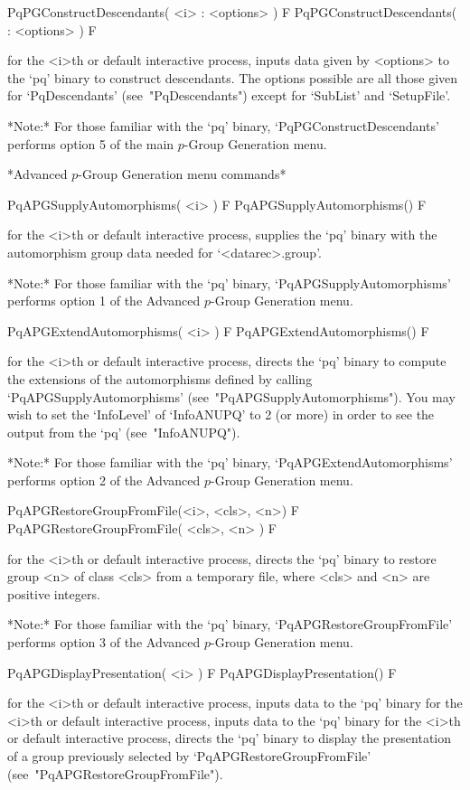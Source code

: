 \>PqPGConstructDescendants( <i> : <options> ) F
\>PqPGConstructDescendants( : <options> ) F

for the <i>th or default interactive {\ANUPQ} process, inputs data  given
by <options> to the `pq' binary to  construct  descendants.  The  options
possible are all those given  for  `PqDescendants'  (see~"PqDescendants")
except for `SubList' and `SetupFile'.

*Note:* 
For those  familiar  with  the  `pq'  binary,  `PqPGConstructDescendants'
performs option 5 of the main $p$-Group Generation menu.

*Advanced $p$-Group Generation menu commands*

\>PqAPGSupplyAutomorphisms( <i> ) F
\>PqAPGSupplyAutomorphisms() F

for the <i>th or default interactive {\ANUPQ} process, supplies the  `pq'
binary with the automorphism group  data  needed  for  `<datarec>.group'.

*Note:*
For those  familiar  with  the  `pq'  binary,  `PqAPGSupplyAutomorphisms'
performs option 1 of the Advanced $p$-Group Generation menu.

\>PqAPGExtendAutomorphisms( <i> ) F
\>PqAPGExtendAutomorphisms() F

for the <i>th or default interactive {\ANUPQ} process, directs  the  `pq'
binary to compute the extensions of the automorphisms defined by  calling
`PqAPGSupplyAutomorphisms' (see~"PqAPGSupplyAutomorphisms"). You may wish
to set the `InfoLevel' of `InfoANUPQ' to 2 (or more) in order to see  the
output from the `pq' (see~"InfoANUPQ").

*Note:*
For  those  familiar  with  the  `pq'  binary, `PqAPGExtendAutomorphisms'
performs option 2 of the Advanced $p$-Group Generation menu.

\>PqAPGRestoreGroupFromFile(<i>, <cls>, <n>) F
\>PqAPGRestoreGroupFromFile( <cls>, <n> ) F

for the <i>th or default interactive {\ANUPQ} process, directs  the  `pq'
binary to restore group <n> of class <cls> from a temporary  file,  where
<cls> and <n> are positive integers.

*Note:*
For those familiar  with  the  `pq'  binary,  `PqAPGRestoreGroupFromFile'
performs option 3 of the Advanced $p$-Group Generation menu.

\>PqAPGDisplayPresentation( <i> ) F
\>PqAPGDisplayPresentation() F

for the <i>th or default interactive {\ANUPQ} process, inputs data to the
`pq' binary for the <i>th or default interactive {\ANUPQ} process, inputs
data to the `pq' binary for the <i>th  or  default  interactive  {\ANUPQ}
process, directs the `pq' binary to display the presentation of  a  group
previously        selected         by         `PqAPGRestoreGroupFromFile'
(see~"PqAPGRestoreGroupFromFile").

